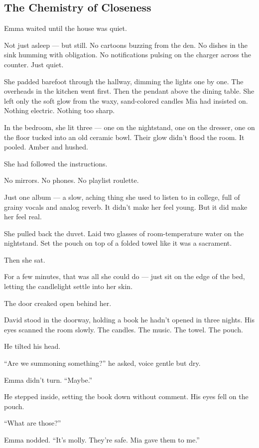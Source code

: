
\subsection{The Chemistry of Closeness}

Emma waited until the house was quiet.

Not just asleep — but still. No cartoons buzzing from the den. No dishes in the sink 
humming with obligation. No notifications pulsing on the charger across the counter. 
Just quiet.

She padded barefoot through the hallway, dimming the lights one by one. The overheads 
in the kitchen went first. Then the pendant above the dining table. She left only the 
soft glow from the waxy, sand-colored candles Mia had insisted on. Nothing electric. 
Nothing too sharp.

In the bedroom, she lit three — one on the nightstand, one on the dresser, one on the 
floor tucked into an old ceramic bowl. Their glow didn’t flood the room. It pooled. 
Amber and hushed.

She had followed the instructions.

No mirrors.
No phones.
No playlist roulette.

Just one album — a slow, aching thing she used to listen to in college, full of grainy vocals 
and analog reverb. It didn’t make her feel young. But it did make her feel real.

She pulled back the duvet. Laid two glasses of room-temperature water on the nightstand. Set 
the pouch on top of a folded towel like it was a sacrament.

Then she sat.

For a few minutes, that was all she could do — just sit on the edge of the bed, letting 
the candlelight settle into her skin.

The door creaked open behind her.

David stood in the doorway, holding a book he hadn’t opened in three nights. His eyes scanned 
the room slowly. The candles. The music. The towel. The pouch.

He tilted his head.

``Are we summoning something?'' he asked, voice gentle but dry.

Emma didn’t turn. ``Maybe.''

He stepped inside, setting the book down without comment. His eyes fell on the pouch.

``What are those?''

Emma nodded. ``It's molly. They’re safe. Mia gave them to me.''

